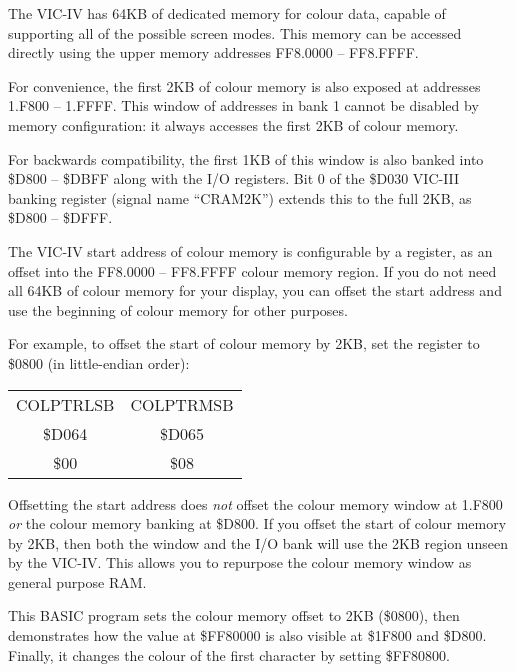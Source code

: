 The VIC-IV has 64KB of dedicated memory for colour data, capable of supporting
all of the possible screen modes. This memory can be accessed directly using
the upper memory addresses FF8.0000 -- FF8.FFFF.

For convenience, the first 2KB of colour memory is
also exposed at addresses 1.F800 -- 1.FFFF. This window of addresses in bank 1
cannot be disabled by memory configuration: it always accesses the first 2KB of
colour memory.

For backwards compatibility, the first 1KB of this window is also banked
into \$D800 -- \$DBFF along with the I/O registers. Bit 0 of the \$D030 VIC-III
banking register (signal name ``CRAM2K'') extends this to the full 2KB, as \$D800
-- \$DFFF.

The VIC-IV start address of colour memory is configurable by a register, as an
offset into the FF8.0000 -- FF8.FFFF colour memory region. If you do not need
all 64KB of colour memory for your display, you can offset the start address
and use the beginning of colour memory for other purposes.

For example, to offset the start of colour memory by 2KB, set the register to
\$0800 (in little-endian order):

\begin{center}
\begin{tabular}{|c|c|}
\hline
COLPTRLSB & COLPTRMSB \\
\$D064 & \$D065 \\
\hline
\$00 & \$08 \\
\hline
\end{tabular}
\end{center}

Offsetting the start address does {\em not} offset the colour memory window at 1.F800
{\em or} the colour memory banking at \$D800. If you offset the start of colour
memory by 2KB, then both the window and the I/O bank will use the 2KB region
unseen by the VIC-IV. This allows you to repurpose the colour memory window as
general purpose RAM.

This BASIC program sets the colour memory offset to 2KB (\$0800), then
demonstrates how the value at \$FF80000 is also visible at \$1F800 and \$D800.
Finally, it changes the colour of the first character by setting \$FF80800.



